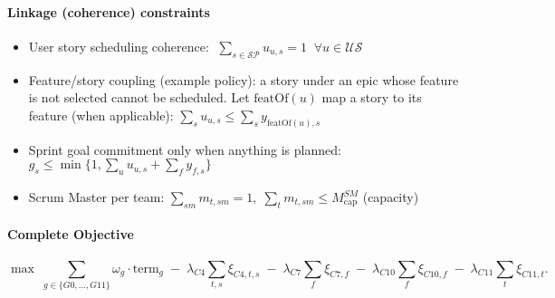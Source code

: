 \documentclass[11pt,a4paper]{article}
\begin{document}
\paragraph{Linkage (coherence) constraints}
\begin{itemize}[leftmargin=2.2em]
  \item User story scheduling coherence: $\;\sum_{s\in\mathcal{SP}} u_{u,s}=1\;\; \forall u\in\mathcal{US}$
  \item Feature/story coupling (example policy): a story under an epic whose feature is not selected cannot be scheduled. Let $\text{featOf}(u)$ map a story to its feature (when applicable): $\sum_{s} u_{u,s} \le \sum_{s} y_{\text{featOf}(u),s}$
  \item Sprint goal commitment only when anything is planned: $g_s \le \min\big\{1,\sum_{u}u_{u,s} + \sum_{f} y_{f,s}\big\}$
  \item Scrum Master per team: $\sum_{sm} m_{t,sm}=1,\;\sum_{t} m_{t,sm}\le M^{SM}_{\text{cap}}$ (capacity)
\end{itemize}

\paragraph{Complete Objective}
\[
\max\;
\sum_{g\in\{G0,\dots,G11\}}
\omega_g \cdot \text{term}_g
\;-\;
\lambda_{C4}\sum_{t,s}\xi_{C4,t,s}
\;-\;
\lambda_{C7}\sum_{f}\xi_{C7,f}
\;-\;
\lambda_{C10}\sum_{f}\xi_{C10,f}
\;-\;
\lambda_{C11}\sum_{t}\xi_{C11,t}.
\]
\end{document}
